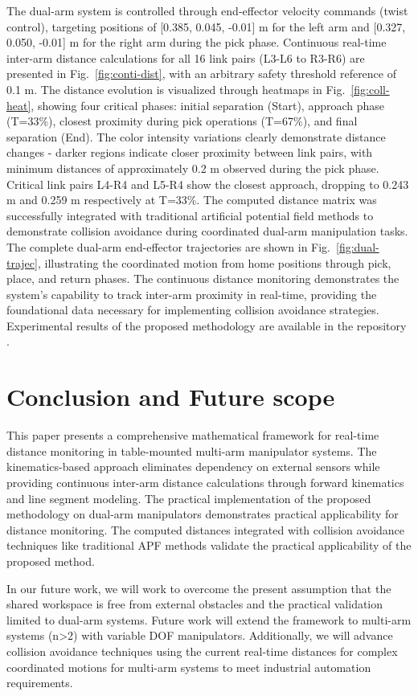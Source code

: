 \documentclass[10pt,twocolumn]{ICCAS}
\begin{document}
The dual-arm system is controlled through end-effector velocity commands (twist control), targeting positions of [0.385, 0.045, -0.01] m for the left arm and [0.327, 0.050, -0.01] m for the right arm during the pick phase. Continuous real-time inter-arm distance calculations for all 16 link pairs (L3-L6 to R3-R6) are presented in Fig.~\ref{fig:conti-dist}, with an arbitrary safety threshold reference of 0.1 m.
The distance evolution is visualized through heatmaps in Fig.~\ref{fig:coll-heat}, showing four critical phases: initial separation (Start), approach phase (T=33\%), closest proximity during pick operations (T=67\%), and final separation (End). The color intensity variations clearly demonstrate distance changes - darker regions indicate closer proximity between link pairs, with minimum distances of approximately 0.2 m observed during the pick phase. Critical link pairs L4-R4 and L5-R4 show the closest approach, dropping to 0.243 m and 0.259 m respectively at T=33\%. The computed distance matrix was successfully integrated with traditional artificial potential field methods to demonstrate collision avoidance during coordinated dual-arm manipulation tasks. The complete dual-arm end-effector trajectories are shown in Fig.~\ref{fig:dual-trajec}, illustrating the coordinated motion from home positions through pick, place, and return phases. The continuous distance monitoring demonstrates the system's capability to track inter-arm proximity in real-time, providing the foundational data necessary for implementing collision avoidance strategies. Experimental results of the proposed methodology are available in the repository \cite{git_repo}.

\section{Conclusion and Future scope}
\label{conclusion}
This paper presents a comprehensive mathematical framework for real-time distance monitoring in table-mounted multi-arm manipulator systems. The kinematics-based approach eliminates dependency on external sensors while providing continuous inter-arm distance calculations through forward kinematics and line segment modeling. The practical implementation of the proposed methodology on dual-arm manipulators demonstrates practical applicability for distance monitoring. The computed distances integrated with collision avoidance techniques like traditional APF methods validate the practical applicability of the proposed method.

In our future work, we will work to overcome the present assumption that the shared workspace is free from external obstacles and the practical validation limited to dual-arm systems. Future work will extend the framework to multi-arm systems (n>2) with variable DOF manipulators. Additionally, we will advance collision avoidance techniques using the current real-time distances for complex coordinated motions for multi-arm systems to meet industrial automation requirements.


\end{document}
